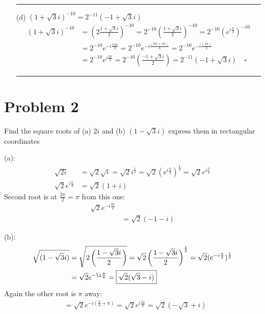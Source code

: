 \documentclass{article}
\begin{document}
\begin{enumerate}
\begin{align*}
  \end{align*}
\hrule
\item[(d)] $(1 + \sqrt{3}i)^{-10}= 2^{-11}(-1 + \sqrt{3}i)$
  \begin{align*}
    (1 + \sqrt{3}i)^{-10} &= \left(2 \frac{1 + \sqrt{3}i}{2}\right)^{-10} = 2^{-10}\left( \frac{1 + \sqrt{3}i}{2}\right)^{-10} = 2^{-10}\left(e^{i\frac{\pi}{3}}\right)^{-10} \\
                          &= 2^{-10}e^{-i\frac{10\pi}{3}} = 2^{-10}e^{-i\frac{(6\pi + 4\pi)}{3}} = 2^{-10}e^{-i\frac{(4\pi)}{3}} \\
                          &= 2^{-10}e^{i\frac{2\pi}{3}} = 2^{-10}\left(\frac{-1 + \sqrt{3}i}{2}\right) = 2^{-11}(-1 + \sqrt{3}i)
                            \quad \square
  \end{align*}
\hrule
\end{enumerate}

\vspace{.5cm} %


\newpage
\section*{Problem 2}
Find the square roots of (a) $2i$ and (b) $(1-\sqrt{3}i)$ express them in rectangular coordinates

(a):
\begin{align*}
  \sqrt{2i} &= \sqrt{2}\sqrt{i} = \sqrt{2}i^{\frac{1}{2}} = \sqrt{2} (e^{i\frac{\pi}{2}})^{\frac{1}{2}} = \sqrt{2}e^{i\frac{\pi}{4}} \\
  \sqrt{2}e^{i\frac{\pi}{4}} &= \boxed{\sqrt{2}(1+i)}
\end{align*}
Second root is at $\frac{2\pi}{2} = \pi$ from this one:
\begin{align*}
  \sqrt{2}e^{-i\frac{3\pi}{4}}& \\
  &= \boxed{\sqrt{2}(-1 -i)}
\end{align*}

(b):
\begin{align*}
  \sqrt{(1-\sqrt{3}i)} &=  \sqrt{2\left(\frac{1-\sqrt{3}i}{2}\right)} = \sqrt{2}\left(\frac{1-\sqrt{3}i}{2}\right)^{\frac{1}{2}} = \sqrt{2} (e^{-i\frac{\pi}{3}})^{\frac{1}{2}} \\
  &= \sqrt{2}e^{-\i\frac{\pi}{6}}  = \boxed{\sqrt{2}(\sqrt{3} - i)}
\end{align*}
Again the other root is $\pi$ away:
\begin{align*}
  &= \sqrt{2}e^{-i(\frac{\pi}{6} + \pi)} = \sqrt{2}e^{i\frac{5\pi}{6}} = \boxed{\sqrt{2}(-\sqrt{3} + i)}
\end{align*}
\newpage
\end{document}
